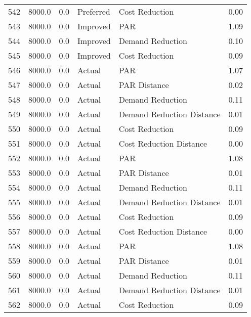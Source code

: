 \begin{longtable}{lrrllr}
542  &       8000.0 &     0.0 &      Preferred &             Cost Reduction &   0.00 \\
543  &       8000.0 &     0.0 &       Improved &                        PAR &   1.09 \\
544  &       8000.0 &     0.0 &       Improved &           Demand Reduction &   0.10 \\
545  &       8000.0 &     0.0 &       Improved &             Cost Reduction &   0.09 \\
546  &       8000.0 &     0.0 &         Actual &                        PAR &   1.07 \\
547  &       8000.0 &     0.0 &         Actual &               PAR Distance &   0.02 \\
548  &       8000.0 &     0.0 &         Actual &           Demand Reduction &   0.11 \\
549  &       8000.0 &     0.0 &         Actual &  Demand Reduction Distance &   0.01 \\
550  &       8000.0 &     0.0 &         Actual &             Cost Reduction &   0.09 \\
551  &       8000.0 &     0.0 &         Actual &    Cost Reduction Distance &   0.00 \\
552  &       8000.0 &     0.0 &         Actual &                        PAR &   1.08 \\
553  &       8000.0 &     0.0 &         Actual &               PAR Distance &   0.01 \\
554  &       8000.0 &     0.0 &         Actual &           Demand Reduction &   0.11 \\
555  &       8000.0 &     0.0 &         Actual &  Demand Reduction Distance &   0.01 \\
556  &       8000.0 &     0.0 &         Actual &             Cost Reduction &   0.09 \\
557  &       8000.0 &     0.0 &         Actual &    Cost Reduction Distance &   0.00 \\
558  &       8000.0 &     0.0 &         Actual &                        PAR &   1.08 \\
559  &       8000.0 &     0.0 &         Actual &               PAR Distance &   0.01 \\
560  &       8000.0 &     0.0 &         Actual &           Demand Reduction &   0.11 \\
561  &       8000.0 &     0.0 &         Actual &  Demand Reduction Distance &   0.01 \\
562  &       8000.0 &     0.0 &         Actual &             Cost Reduction &   0.09 \\

\end{longtable}
